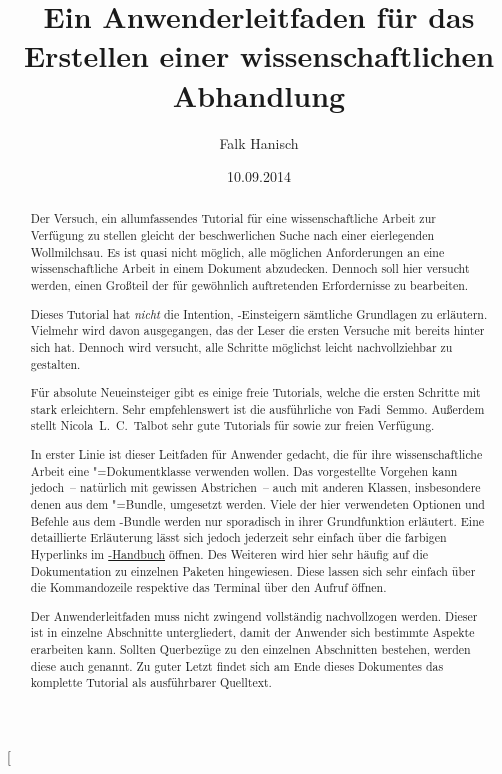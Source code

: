 \documentclass[english,ngerman]{tudscrartcl}
\begin{document}
\title{%
  Ein Anwenderleitfaden für das Erstellen einer wissenschaftlichen Abhandlung%
}
\author{Falk Hanisch}
\date{10.09.2014}
\makeatletter
\begingroup%
  \def\and{, }%
  \let\thanks\@gobble%
  \let\footnote\@gobble%
\endgroup%
\makeatother
\StartTutorial[%
  \begin{abstract}\noindent
  Der Versuch, ein allumfassendes Tutorial für eine wissenschaftliche Arbeit 
  zur Verfügung zu stellen gleicht der beschwerlichen Suche nach einer 
  eierlegenden Wollmilchsau. Es ist quasi nicht möglich, alle möglichen 
  Anforderungen an eine wissenschaftliche Arbeit in einem Dokument abzudecken. 
  Dennoch soll hier versucht werden, einen Großteil der für gewöhnlich 
  auftretenden Erfordernisse zu bearbeiten.
  
  Dieses Tutorial hat \emph{nicht} die Intention, -Einsteigern 
  sämtliche Grundlagen zu erläutern. Vielmehr wird davon ausgegangen, das der 
  Leser die ersten Versuche mit  bereits hinter sich hat. 
  Dennoch wird versucht, alle Schritte möglichst leicht nachvollziehbar zu 
  gestalten.
  
  Für absolute Neueinsteiger gibt es einige freie Tutorials, welche die ersten 
  Schritte mit  stark erleichtern. Sehr empfehlenswert ist die 
  ausführliche  
  von Fadi~Semmo. Außerdem stellt Nicola~L.~C.~Talbot sehr gute Tutorials für 
  sowie  zur 
  freien Verfügung.
  
  In erster Linie ist dieser Leitfaden für Anwender gedacht, die für ihre
  wissenschaftliche Arbeit eine \TUDScript"=Dokumentklasse verwenden wollen. 
  Das vorgestellte Vorgehen kann jedoch~-- natürlich mit gewissen Abstrichen~-- 
  auch mit anderen Klassen, insbesondere denen aus dem \KOMAScript"=Bundle, 
  umgesetzt werden. Viele der hier verwendeten Optionen und Befehle aus dem 
  \TUDScript-Bundle werden nur sporadisch in ihrer Grundfunktion erläutert. 
  Eine detaillierte Erläuterung lässt sich jedoch jederzeit sehr einfach über 
  die farbigen Hyperlinks im \href{run:../tudscr.pdf}{\TUDScript-Handbuch} 
  öffnen. Des Weiteren wird hier sehr häufig auf die Dokumentation zu einzelnen 
  Paketen hingewiesen. Diese lassen sich sehr einfach über die Kommandozeile 
  respektive das Terminal über den Aufruf  öffnen.
  
  Der Anwenderleitfaden muss nicht zwingend vollständig nachvollzogen werden. 
  Dieser ist in einzelne Abschnitte untergliedert, damit der Anwender sich 
  bestimmte Aspekte erarbeiten kann. Sollten Querbezüge zu den einzelnen 
  Abschnitten bestehen, werden diese auch genannt. Zu guter Letzt findet sich 
  am Ende dieses Dokumentes das komplette Tutorial als ausführbarer Quelltext. 
  \end{abstract}
\end{document}
